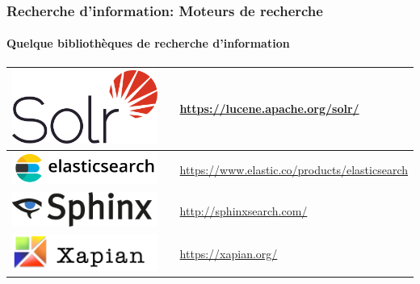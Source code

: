 \documentclass{beamer}
\begin{document}
\begin{frame}
\frametitle{Recherche d'information: Moteurs de recherche}
\framesubtitle{Quelque bibliothèques de recherche d'information}

\begin{tabular}{p{}cp{}}
	
	\hline
	
	\includegraphics[height=.8cm]{..//img/Bweb02-ri-gmail/solr-logo.png} &
	& 
	\url{https://lucene.apache.org/solr/}  \\
	
	\hline
	
	\includegraphics[height=.8cm]{..//img/Bweb02-ri-gmail/elastic-logo.png} &
	& 
	\url{https://www.elastic.co/products/elasticsearch} \\
	
	\hline
	
	\includegraphics[height=.8cm]{..//img/Bweb02-ri-gmail/sphinx-logo.png} & 
	& 
	\url{http://sphinxsearch.com/} \\
	
	\hline
	
	\includegraphics[height=.8cm]{..//img/Bweb02-ri-gmail/xapian-logo.png} & 
	& 
	\url{https://xapian.org/} \\
	
	\hline
	
\end{tabular}


\end{frame}
\end{document}
